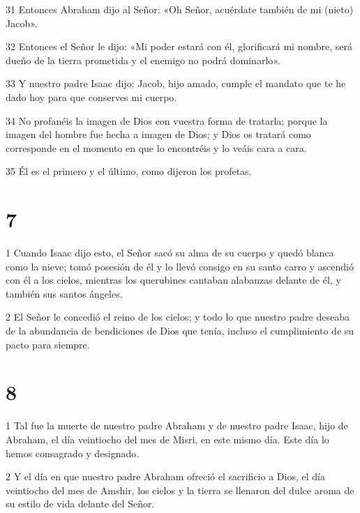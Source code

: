 \par 31 Entonces Abraham dijo al Señor: «Oh Señor, acuérdate también de mi (nieto) Jacob».

\par 32 Entonces el Señor le dijo: «Mi poder estará con él, glorificará mi nombre, será dueño de la tierra prometida y el enemigo no podrá dominarlo».

\par 33 Y nuestro padre Isaac dijo: Jacob, hijo amado, cumple el mandato que te he dado hoy para que conserves mi cuerpo.

\par 34 No profanéis la imagen de Dios con vuestra forma de tratarla; porque la imagen del hombre fue hecha a imagen de Dios; y Dios os tratará como corresponde en el momento en que lo encontréis y lo veáis cara a cara.

\par 35 Él es el primero y el último, como dijeron los profetas.

\chapter{7}

\par 1 Cuando Isaac dijo esto, el Señor sacó su alma de su cuerpo y quedó blanca como la nieve; tomó posesión de él y lo llevó consigo en su santo carro y ascendió con él a los cielos, mientras los querubines cantaban alabanzas delante de él, y también sus santos ángeles.

\par 2 El Señor le concedió el reino de los cielos; y todo lo que nuestro padre deseaba de la abundancia de bendiciones de Dios que tenía, incluso el cumplimiento de su pacto para siempre.

\chapter{8}

\par 1 Tal fue la muerte de nuestro padre Abraham y de nuestro padre Isaac, hijo de Abraham, el día veintiocho del mes de Misri, en este mismo día. Este día lo hemos consagrado y designado.

\par 2 Y el día en que nuestro padre Abraham ofreció el sacrificio a Dios, el día veintiocho del mes de Amshir, los cielos y la tierra se llenaron del dulce aroma de su estilo de vida delante del Señor.

